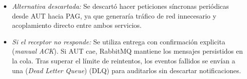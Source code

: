 \begin{itemize}
\begin{itemize}
        \item \textit{Alternativa descartada:}
        Se descartó hacer peticiones síncronas periódicas desde AUT hacia PAG, ya que generaría tráfico de red innecesario y acoplamiento directo entre ambos servicios. 

        \item \textit{Si el receptor no responde:}
        Se utiliza entrega con confirmación explicita (\textit{manual ACK}). Si AUT cae, RabbitMQ mantiene los mensajes persistidos en la cola. Tras superar el límite de 
        reintentos, los eventos fallidos se envían a una (\textit{Dead Letter Queue}) (DLQ) para auditarlos sin descartar notificaciones.
    \end{itemize}
\end{itemize}
